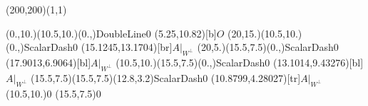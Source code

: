 \unitlength=1bp%

\begin{feynartspicture}(200,200)(1,1)

\FADiagram{}
\FAProp(0.,10.)(10.5,10.)(0.,){DoubleLine}{0}
\FALabel(5.25,10.82)[b]{$O$}
\FAProp(20,15.)(10.5,10.)(0.,){ScalarDash}{0}
\FALabel(15.1245,13.1704)[br]{$A|_{W^\perp}$}
\FAProp(20,5.)(15.5,7.5)(0.,){ScalarDash}{0}
\FALabel(17.9013,6.9064)[bl]{$A|_{W^\perp}$}
\FAProp(10.5,10.)(15.5,7.5)(0.,){ScalarDash}{0}
\FALabel(13.1014,9.43276)[bl]{$A|_{W^\perp}$}
\FAProp(15.5,7.5)(15.5,7.5)(12.8,3.2){ScalarDash}{0}
\FALabel(10.8799,4.28027)[tr]{$A|_{W^\perp}$}
\FAVert(10.5,10.){0}
\FAVert(15.5,7.5){0}
\end{feynartspicture}

